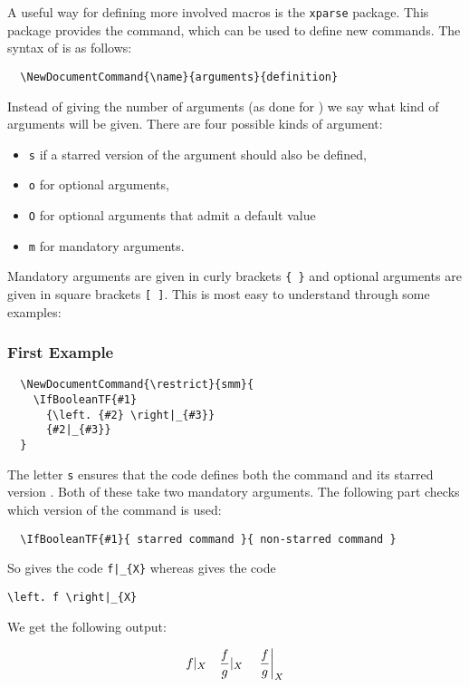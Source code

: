 \documentclass[a4paper, 10pt, abstract=on, headings=standardclasses]{scrartcl}
\begin{document}
A useful way for defining more involved macros is the \texttt{xparse} package.
This package provides the  command, which can be used to define new commands.
The syntax of  is as follows:
\begin{lstlisting}
  \NewDocumentCommand{\name}{arguments}{definition}
\end{lstlisting}
Instead of giving the number of arguments (as done for ) we say what kind of arguments will be given.
There are four possible kinds of argument:
\begin{itemize}
  \item
    \texttt{s} if a starred version of the argument should also be defined,
  \item
    \texttt{o} for optional arguments,
  \item
    \texttt{O} for optional arguments that admit a default value
  \item 
    \texttt{m} for mandatory arguments.
\end{itemize}
Mandatory arguments are given in curly brackets \texttt{\{ \}} and optional arguments are given in square brackets \texttt{[ ]}.
This is most easy to understand through some examples:

\subsubsection{First Example}

\begin{lstlisting}
  \NewDocumentCommand{\restrict}{smm}{
    \IfBooleanTF{#1}
      {\left. {#2} \right|_{#3}}
      {#2|_{#3}}
  }
\end{lstlisting}
The letter \texttt{s} ensures that the code defines both the command  and its starred version .
Both of these take two mandatory arguments.
The following part checks which version of the command is used:
\begin{lstlisting}
  \IfBooleanTF{#1}{ starred command }{ non-starred command }
\end{lstlisting}
So  gives the code \texttt{f|\_\{X\}} whereas  gives the code
\begin{center}
  \texttt{{\textbackslash}left. f {\textbackslash}right|\_\{X\}}
\end{center}
We get the following output:
\begin{LTXexample}[pos = r]
  \[
    \restrict{f}{X}
    \quad
    \restrict{\frac{f}{g}}{X}
    \quad
    \restrict*{\frac{f}{g}}{X}
  \]
\end{LTXexample}
\end{document}
